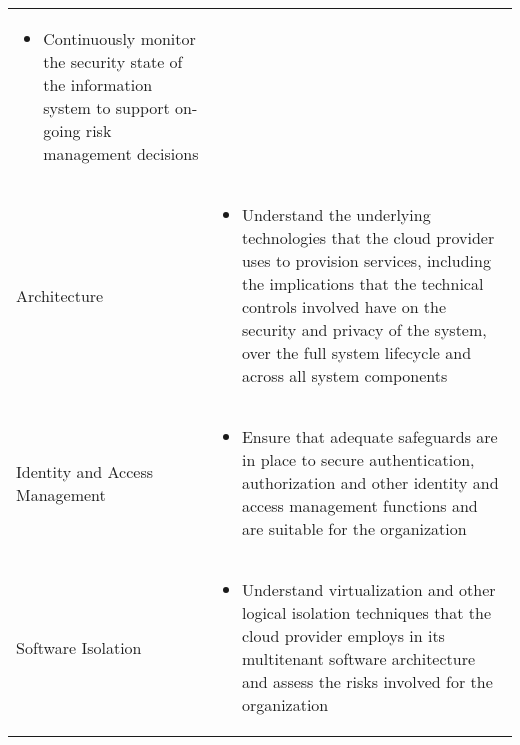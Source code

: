 \begin{table}[h]
\begin{tabular}{p{3cm} | p{12cm}}
\begin{itemize}
            \item Continuously monitor the security state of the information system to support on-going risk management decisions
        \end{itemize}\\
        Architecture &
        \begin{itemize}
            \item Understand the underlying technologies that the cloud provider uses to provision services, including the implications that the technical controls involved have on the security and privacy of the system, over the full system lifecycle and across all system components
        \end{itemize}\\
        Identity and Access Management &
        \begin{itemize}
            \item Ensure that adequate safeguards are in place to secure authentication, authorization and other identity and access management functions and are suitable for the organization
        \end{itemize}\\
        Software Isolation &
        \begin{itemize}
            \item Understand virtualization and other logical isolation techniques that the cloud provider employs in its multitenant software architecture and assess the risks involved for the organization
        \end{itemize}
    \end{tabular}
\end{table}

